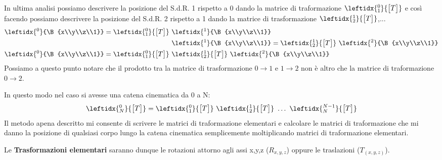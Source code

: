 In ultima analisi possiamo descrivere la posizione del S.d.R. 1 rispetto a 0 dando la matrice di traformazione $\leftidx{_1^0}{\M{T}}$ e così facendo possiamo descrivere la posizione del S.d.R. 2 rispetto a 1 dando la matrice di trasformazione $\leftidx{_2^1}{\M{T}}$,...
\begin{align*}
\leftidx{^0}{\B{x\\y\\z\\1}} = \leftidx{_1^0}{\M{T}}\,\,&\leftidx{^1}{\B{x\\y\\z\\1}}\\
&\leftidx{^1}{\B{x\\y\\z\\1}} = \leftidx{_2^1}{\M{T}}\,\,\leftidx{^2}{\B{x\\y\\z\\1}}\\
\leftidx{^0}{\B{x\\y\\z\\1}} = \leftidx{_1^0}{\M{T}}\,\,&\leftidx{_2^1}{\M{T}}\,\,\leftidx{^2}{\B{x\\y\\z\\1}}
\end{align*}
Possiamo a questo punto notare che il prodotto tra la matrice di trasformazione $0\rightarrow1$ e $1\rightarrow2$ non è altro che la matrice di traformazione $0\rightarrow2$.

In questo modo nel caso si avesse una catena cinematica da 0 a N:
\[\leftidx{_N^0}{\M{T}} = \leftidx{_1^0}{\M{T}}\,\,\leftidx{_2^1}{\M{T}}\,\,\dots\,\,\leftidx{^{N-1}_N}{\M{T}}\]
Il metodo apena descritto mi consente di scrivere le matrici di traformazione elementari e calcolare le matrici di traformazione che mi danno la posizione di qualsiasi corpo lungo la catena cinematica semplicemente moltiplicando matrici di traformazione elementari.

Le \textbf{Trasformazioni elementari} saranno dunque le rotazioni attorno agli assi x,y,z ($R_{x,y,z}$) oppure le traslazioni ($T_{(x,y,z)}$).

